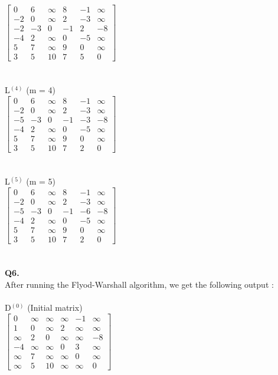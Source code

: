 \documentclass[11pt]{article}
\begin{document}
$\begin{bmatrix}
0 & 6 & \infty & 8 & -1 & \infty\\
-2 & 0 & \infty & 2 & -3 & \infty\\
-2 & -3 & 0 & -1 & 2 & -8\\
-4 & 2 & \infty & 0 & -5 & \infty\\
5 & 7 & \infty & 9 & 0 & \infty\\
3 & 5 & 10 & 7 & 5 & 0
\end{bmatrix}$\\\\\\
\vspace*{3ex}L$^{(4)}$ (m = 4)\\
$\begin{bmatrix}
0 & 6 & \infty & 8 & -1 & \infty\\
-2 & 0 & \infty & 2 & -3 & \infty\\
-5 & -3 & 0 & -1 & -3 & -8\\
-4 & 2 & \infty & 0 & -5 & \infty\\
5 & 7 & \infty & 9 & 0 & \infty\\
3 & 5 & 10 & 7 & 2 & 0
\end{bmatrix}$\\\\\\
\vspace*{3ex}L$^{(5)}$ (m = 5)\\
$\begin{bmatrix}
0 & 6 & \infty & 8 & -1 & \infty\\
-2 & 0 & \infty & 2 & -3 & \infty\\
-5 & -3 & 0 & -1 & -6 & -8\\
-4 & 2 & \infty & 0 & -5 & \infty\\
5 & 7 & \infty & 9 & 0 & \infty\\
3 & 5 & 10 & 7 & 2 & 0
\end{bmatrix}$\\\\\\
\vspace{5mm}
\hline
\vspace{5mm}
\textbf{Q6.}\\
After running the Flyod-Warshall algorithm, we get the following output : \\\\ 
\vspace*{3ex}D$^{(0)}$ (Initial matrix)\\
$\begin{bmatrix}
0 & \infty & \infty & \infty & -1 & \infty\\
1 & 0 & \infty & 2 & \infty & \infty\\
\infty & 2 & 0 & \infty & \infty & -8\\
-4 & \infty & \infty & 0 & 3 & \infty\\
\infty & 7 & \infty & \infty & 0 & \infty\\
\infty & 5 & 10 & \infty & \infty & 0
\end{bmatrix}$\\\\\\
\end{document}

